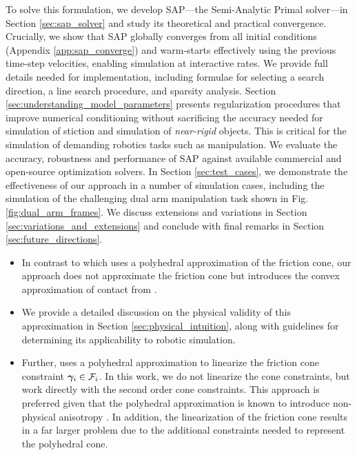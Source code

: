 To solve this formulation, we develop SAP---the Semi-Analytic Primal solver---in
Section \ref{sec:sap_solver} and study its theoretical and practical
convergence.  Crucially, we show that SAP globally converges from all initial
conditions (Appendix \ref{app:sap_converge}) and warm-starts effectively using
the previous time-step velocities, enabling simulation at interactive rates. We
provide full details needed for implementation, including formulae for selecting
a search direction, a line search procedure, and sparsity analysis. Section
\ref{sec:understanding_model_parameters} presents regularization procedures that
improve numerical conditioning without sacrificing the accuracy needed for
simulation of stiction and simulation of \emph{near-rigid} objects. This is
critical for the simulation of demanding robotics tasks such as manipulation. We
evaluate the accuracy, robustness and performance of SAP against available
commercial and open-source optimization solvers. In Section
\ref{sec:test_cases}, we demonstrate the effectiveness of our approach in a
number of simulation cases, including the simulation of the challenging dual arm
manipulation task shown in Fig. \ref{fig:dual_arm_frames}. We discuss extensions
and variations in Section \ref{sec:variations_and_extensions} and conclude with
final remarks in Section \ref{sec:future_directions}.



{\color{red} 
\begin{itemize}
    \item In contrast to \cite{bib:potra2006linearly} which
    uses a polyhedral approximation of the friction cone, our approach does not
    approximate the friction cone but introduces the convex approximation of contact
    from \cite{bib:anitescu2006}.
    \item We provide a
    detailed discussion on the physical validity of this approximation in Section
    \ref{sec:physical_intuition}, along with guidelines for determining its
    applicability to robotic simulation.
    \item Further, \cite{bib:anitescu2006} uses a polyhedral approximation to linearize
    the friction cone constraint ${\bm\gamma}_i\in\mathcal{F}_i$. In this work, we do
    not linearize the cone constraints, but work directly with the second order cone
    constraints. This approach is preferred given that the polyhedral approximation
    is known to introduce non-physical anisotropy \cite{bib:li2018implicit}. In
    addition, the linearization of the friction cone results in a far larger problem
    due to the additional constraints needed to represent the polyhedral cone.
\end{itemize}
}